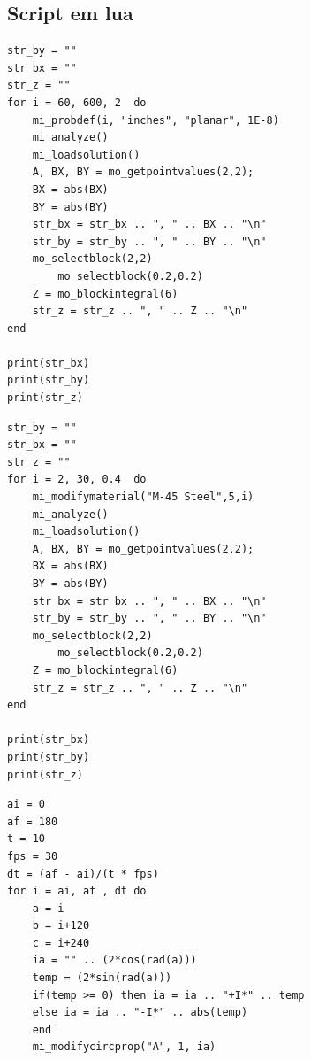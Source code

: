 \documentclass[
	12pt,				%
	openright,			%
	twoside,			%
	a4paper,			%
	english,			%
	french,				%
	spanish,			%
	brazil,				%
	]{abntex2}
\begin{document}
\postextual
\begin{apendicesenv}

\partapendices

\chapter{Script em lua\label{ch:script_lua}}

\begin{lstlisting}[caption={Perda pela frequencia}]
str_by = ""
str_bx = ""
str_z = ""
for i = 60, 600, 2  do
	mi_probdef(i, "inches", "planar", 1E-8)
	mi_analyze()
	mi_loadsolution()
	A, BX, BY = mo_getpointvalues(2,2);
	BX = abs(BX)
	BY = abs(BY)
	str_bx = str_bx .. ", " .. BX .. "\n"
	str_by = str_by .. ", " .. BY .. "\n"
	mo_selectblock(2,2)
        mo_selectblock(0.2,0.2)
	Z = mo_blockintegral(6)
	str_z = str_z .. ", " .. Z .. "\n"
end

print(str_bx)
print(str_by)
print(str_z)
\end{lstlisting}

\newpage

\begin{lstlisting}[caption={Perda pelo sigma}]
str_by = ""
str_bx = ""
str_z = ""
for i = 2, 30, 0.4  do
	mi_modifymaterial("M-45 Steel",5,i)
	mi_analyze()
	mi_loadsolution()
	A, BX, BY = mo_getpointvalues(2,2);
	BX = abs(BX)
	BY = abs(BY)
	str_bx = str_bx .. ", " .. BX .. "\n"
	str_by = str_by .. ", " .. BY .. "\n"
	mo_selectblock(2,2)
        mo_selectblock(0.2,0.2)
	Z = mo_blockintegral(6)
	str_z = str_z .. ", " .. Z .. "\n"
end

print(str_bx)
print(str_by)
print(str_z)
\end{lstlisting}

\newpage

\begin{lstlisting}[caption={Imagem para video do campo girante}]
ai = 0
af = 180
t = 10
fps = 30
dt = (af - ai)/(t * fps)
for i = ai, af , dt do
	a = i
	b = i+120
	c = i+240
	ia = "" .. (2*cos(rad(a)))
	temp = (2*sin(rad(a)))
	if(temp >= 0) then ia = ia .. "+I*" .. temp
	else ia = ia .. "-I*" .. abs(temp)
	end
	mi_modifycircprop("A", 1, ia)


\end{lstlisting}
\end{apendicesenv}
\end{document}
